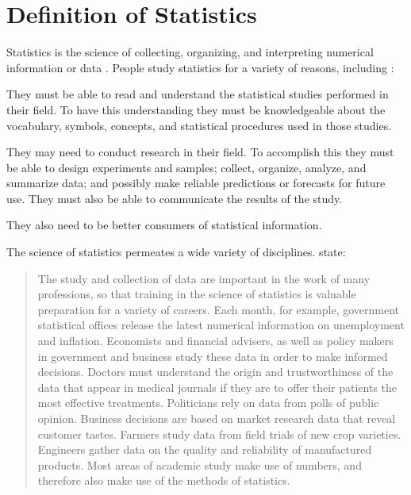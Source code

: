 \documentclass[10pt,openany]{book}\usepackage[]{graphicx}\usepackage[]{color}
\begin{document}
\section{Definition of Statistics}
Statistics is the science of collecting, organizing, and interpreting numerical information or data \citep{MooreMcCabe1998}.  People study statistics for a variety of reasons, including \citep{Bluman2000}:
\begin{Enumerate}
  \item They must be able to read and understand the statistical studies performed in their field. To have this understanding they must be knowledgeable about the vocabulary, symbols, concepts, and statistical procedures used in those studies.
  \item They may need to conduct research in their field. To accomplish this they must be able to design experiments and samples; collect, organize, analyze, and summarize data; and possibly make reliable predictions or forecasts for future use. They must also be able to communicate the results of the study.
  \item They also need to be better consumers of statistical information.
\end{Enumerate}

The science of statistics permeates a wide variety of disciplines. \cite{MooreMcCabe1998} state:
\begin{quote}
The study and collection of data are important in the work of many professions, so that training in the science of statistics is valuable preparation for a variety of careers.  Each month, for example, government statistical offices release the latest numerical information on unemployment and inflation.  Economists and financial advisers, as well as policy makers in government and business study these data in order to make informed decisions.  Doctors must understand the origin and trustworthiness of the data that appear in medical journals if they are to offer their patients the most effective treatments. Politicians rely on data from polls of public opinion.  Business decisions are based on market research data that reveal customer tastes.  Farmers study data from field trials of new crop varieties.  Engineers gather data on the quality and reliability of manufactured products.  Most areas of academic study make use of numbers, and therefore also make use of the methods of statistics.
\end{quote}

\end{document}
